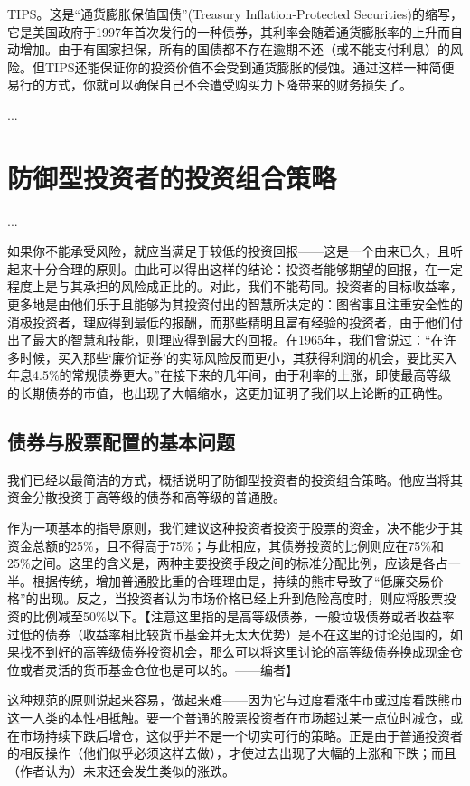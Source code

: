 \documentclass[12pt,oneside]{book}
\begin{document}
TIPS。这是“通货膨胀保值国债”(Treasury Inflation-Protected Securities)的缩写，它是美国政府于1997年首次发行的一种债券，其利率会随着通货膨胀率的上升而自动增加。由于有国家担保，所有的国债都不存在逾期不还（或不能支付利息）的风险。但TIPS还能保证你的投资价值不会受到通货膨胀的侵蚀。通过这样一种简便易行的方式，你就可以确保自己不会遭受购买力下降带来的财务损失了。

...

\section{防御型投资者的投资组合策略}
...

如果你不能承受风险，就应当满足于较低的投资回报——这是一个由来已久，且听起来十分合理的原则。由此可以得出这样的结论：投资者能够期望的回报，在一定程度上是与其承担的风险成正比的。对此，我们不能苟同。投资者的目标收益率，更多地是由他们乐于且能够为其投资付出的智慧所决定的：图省事且注重安全性的消极投资者，理应得到最低的报酬，而那些精明且富有经验的投资者，由于他们付出了最大的智慧和技能，则理应得到最大的回报。在1965年，我们曾说过：“在许多时候，买入那些‘廉价证券’的实际风险反而更小，其获得利润的机会，要比买入年息4.5\%的常规债券更大。”在接下来的几年间，由于利率的上涨，即使最高等级的长期债券的市值，也出现了大幅缩水，这更加证明了我们以上论断的正确性。


\subsection{债券与股票配置的基本问题}
我们已经以最简洁的方式，概括说明了防御型投资者的投资组合策略。他应当将其资金分散投资于高等级的债券和高等级的普通股。

作为一项基本的指导原则，我们建议这种投资者投资于股票的资金，决不能少于其资金总额的25\%，且不得高于75\%；与此相应，其债券投资的比例则应在75\%和25\%之间。这里的含义是，两种主要投资手段之间的标准分配比例，应该是各占一半。根据传统，增加普通股比重的合理理由是，持续的熊市导致了“低廉交易价格”的出现。反之，当投资者认为市场价格已经上升到危险高度时，则应将股票投资的比例减至50\%以下。【注意这里指的是高等级债券，一般垃圾债券或者收益率过低的债券（收益率相比较货币基金并无太大优势）是不在这里的讨论范围的，如果找不到好的高等级债券投资机会，那么可以将这里讨论的高等级债券换成现金仓位或者灵活的货币基金仓位也是可以的。——编者】

这种规范的原则说起来容易，做起来难——因为它与过度看涨牛市或过度看跌熊市这一人类的本性相抵触。要一个普通的股票投资者在市场超过某一点位时减仓，或在市场持续下跌后增仓，这似乎并不是一个切实可行的策略。正是由于普通投资者的相反操作（他们似乎必须这样去做），才使过去出现了大幅的上涨和下跌；而且（作者认为）未来还会发生类似的涨跌。
\end{document}

